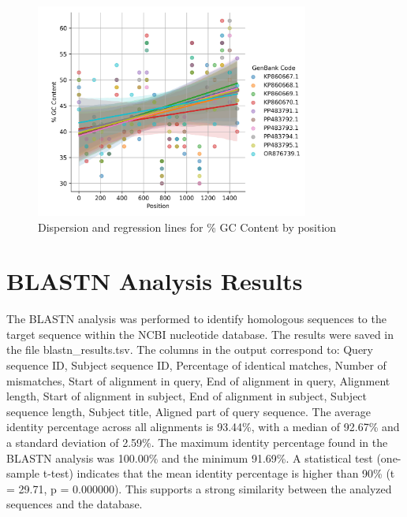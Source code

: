 \documentclass{article}%
\begin{document}
\begin{figure}[!htbp]%
\centering%
\includegraphics[width=0.8\textwidth]{scatterplot_gc.jpg}%
\caption{Dispersion and regression lines for \% GC Content by position}%
\end{figure}

%
\section{BLASTN Analysis Results}%
\label{sec:BLASTNAnalysisResults}%
The BLASTN analysis was performed to identify homologous sequences to the target sequence within the NCBI nucleotide database. The results were saved in the file blastn\_results.tsv. The columns in the output correspond to: Query sequence ID, Subject sequence ID, Percentage of identical matches, Number of mismatches, Start of alignment in query, End of alignment in query, Alignment length, Start of alignment in subject, End of alignment in subject, Subject sequence length, Subject title, Aligned part of query sequence.\newline%
%
\newline%
The average identity percentage across all alignments is 93.44\%, with a median of 92.67\% and a standard deviation of 2.59\%. The maximum identity percentage found in the BLASTN analysis was 100.00\% and the minimum 91.69\%. %
A statistical test (one{-}sample t{-}test) indicates that the mean identity percentage is higher than 90\% (t = 29.71, p = 0.000000). This supports a strong similarity between the analyzed sequences and the database.%
\end{document}
